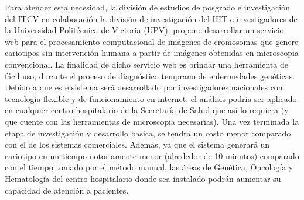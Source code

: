 \documentclass[12pt,letterpaper,titlepage]{article}
\begin{document}
Para atender esta necesidad, la división de estudios de posgrado e investigación del ITCV en colaboración la división de investigación del HIT e investigadores de la Universidad Politécnica de Victoria (UPV), propone desarrollar un servicio web para el procesamiento computacional de imágenes de cromosomas que genere cariotipos sin intervención humana a partir de imágenes obtenidas en microscopia convencional. La finalidad de dicho servicio web es brindar una herramienta de fácil uso, durante el proceso de diagnóstico temprano de enfermedades genéticas. Debido a que este sistema será desarrollado por investigadores nacionales con tecnología flexible y de funcionamiento en internet, el análisis podría ser aplicado en cualquier centro hospitalario de la Secretaría de Salud que así lo requiera (y que cuente con las herramientas de microscopia necesarias). Una vez terminada la etapa de investigación y desarrollo básica, se tendrá un costo menor comparado con el de los sistemas comerciales. Además, ya que el sistema generará un cariotipo en un tiempo notoriamente menor (alrededor de 10 minutos) comparado con el tiempo tomado por el método manual, las áreas de Genética, Oncología y Hematología del centro hospitalario donde sea instalado podrán aumentar su capacidad de atención a pacientes. \\



\end{document}
